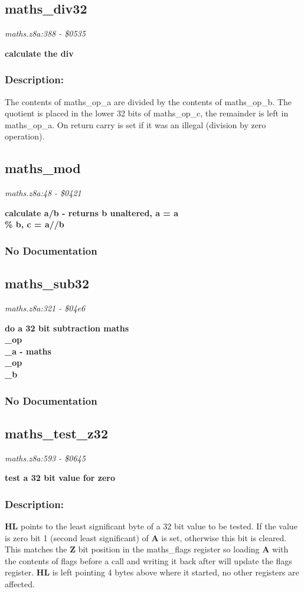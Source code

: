 \subsection{maths\_div32}
\textit{maths.z8a:388 - \$0535}

\noindent
\textbf{calculate the div}

\subsubsection{Description:}
 The contents of maths\_op\_a are divided by the contents of maths\_op\_b.  The quotient is placed in the lower 32 bits of maths\_op\_c, the remainder is left in maths\_op\_a.  On return carry is set if it was an illegal (division by zero operation).

\subsection{maths\_mod}
\textit{maths.z8a:48 - \$0421}

\noindent
\textbf{calculate a/b - returns b unaltered, a = a \\\% b, c = a//b}

\subsubsection{No Documentation}


\subsection{maths\_sub32}
\textit{maths.z8a:321 - \$04e6}

\noindent
\textbf{do a 32 bit subtraction maths\\\_op\\\_a - maths\\\_op\\\_b}

\subsubsection{No Documentation}


\subsection{maths\_test\_z32}
\textit{maths.z8a:593 - \$0645}

\noindent
\textbf{test a 32 bit value for zero}

\subsubsection{Description:}
 \textbf{HL} points to the least significant byte of a 32 bit value to be tested.  If the value is zero bit 1 (second least significant) of \textbf{A} is set, otherwise this bit is cleared.  This matches the \textbf{Z} bit position in the maths\_flags  register so loading \textbf{A} with the contents of flags before a call and writing it back after will update the flags register.  \textbf{HL} is left pointing 4 bytes above where it started, no other registers are affected.

